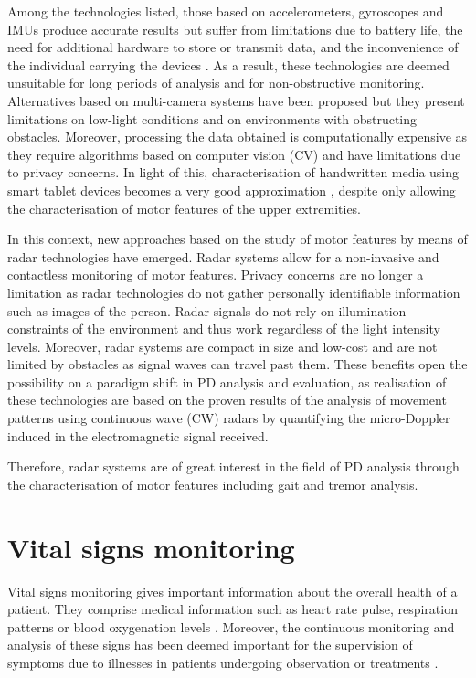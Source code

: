 	Among the technologies listed, those based on accelerometers, gyroscopes and IMUs produce accurate results but suffer from limitations due to battery life, the need for additional hardware to store or transmit data, and the inconvenience of the individual carrying the devices \cite{Biase2020}. As a result, these technologies are deemed unsuitable for long periods of analysis and for non-obstructive monitoring. Alternatives based on multi-camera systems have been proposed \cite{MurodelaHerran2014} but they present limitations on low-light conditions and on environments with obstructing obstacles. Moreover, processing the data obtained is computationally expensive as they require algorithms based on computer vision (CV) and have limitations due to privacy concerns. In light of this, characterisation of handwritten media using smart tablet devices becomes a very good approximation \cite{Danna2019}, despite only allowing the characterisation of motor features of the upper extremities.

	In this context, new approaches based on the study of motor features by means of radar technologies have emerged. Radar systems allow for a non-invasive and contactless monitoring of motor features. Privacy concerns are no longer a limitation as radar technologies do not gather personally identifiable information such as images of the person. Radar signals do not rely on illumination constraints of the environment and thus work regardless of the light intensity levels. Moreover, radar systems are compact in size and low-cost and are not limited by obstacles as signal waves can travel past them. These benefits open the possibility on a paradigm shift in PD analysis and evaluation, as realisation of these technologies are based on the proven results of the analysis of movement patterns using continuous wave (CW) radars \cite{Seifert2019, Biase2020} by quantifying the micro-Doppler induced in the electromagnetic signal received.
	
	Therefore, radar systems are of great interest in the field of PD analysis through the characterisation of motor features including gait and tremor analysis.
	
	
	\section{Vital signs monitoring}
	
	Vital signs monitoring gives important information about the overall health of a patient. They comprise medical information such as heart rate pulse, respiration patterns or blood oxygenation levels \cite{Iyer2022}. Moreover, the continuous monitoring and analysis of these signs has been deemed important for the supervision of symptoms due to illnesses in patients undergoing observation or treatments \cite{Prgomet2016,Weenk2017,Villarroel2014}.
	
